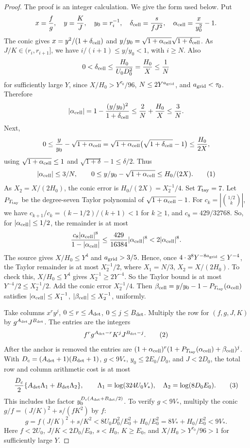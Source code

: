 \begin{proof}
The proof is an integer calculation. We give the form used below. Put
\[
 x={f\over g},\quad y={K\over J},\quad y_0=r_i^{-1},\quad
 \delta_{\rm cell}={s\over fJ^2},\quad
 \alpha_{\rm cell}={x\over y_0^2}-1.
\]
The conic gives \(x=y^2/(1+\delta_{\rm cell})\) and
\(y/y_0=\sqrt{1+\alpha_{\rm cell}}\sqrt{1+\delta_{\rm cell}}\).
As \(J/K\in(r_i,r_{i+1}]\), we have
\(i/(i+1)\le y/y_0<1\), with \(i\ge N\). Also
\[
0<\delta_{\rm cell}\le \frac{H_0}{U_0D_0^2}
=\frac{H_0}{X}\le\frac1N
\]
for sufficiently large \(Y\), since \(X/H_0>Y^{\tau_0}/96\),
\(N\le2Y^{a_{\rm grid}}\), and \(a_{\rm grid}<\tau_0\). Therefore
\[
|\alpha_{\rm cell}|
=1-\frac{(y/y_0)^2}{1+\delta_{\rm cell}}
\le \frac2N+\frac{H_0}{X}
\le\frac3N.
\]
Next,
\[
0\le\frac{y}{y_0}-\sqrt{1+\alpha_{\rm cell}}
=\sqrt{1+\alpha_{\rm cell}}\bigl(\sqrt{1+\delta_{\rm cell}}-1\bigr)
\le\frac{H_0}{2X},
\]
using \(\sqrt{1+\alpha_{\rm cell}}\le1\) and
\(\sqrt{1+\delta}-1\le\delta/2\). Thus
\[
 |\alpha_{\rm cell}|\le3/N,\qquad
 0\le y/y_0-\sqrt{1+\alpha_{\rm cell}}\le H_0/(2X).
 \AutoTag{eq:old:7_10a}
\]
As \(X_2=X/(2H_0)\), the conic error is
\(H_0/(2X)=X_2^{-1}/4\).
Set \(T_{\rm tay}=7\). Let \(P_{T_{\rm tay}}\) be the degree-seven
Taylor polynomial of \(\sqrt{1+\alpha_{\rm cell}}-1\). For
\(c_k=|\binom{1/2}{k}|\), we have
\(c_{k+1}/c_k=(k-1/2)/(k+1)<1\) for \(k\ge1\), and
\(c_8=429/32768\). So, for
\(|\alpha_{\rm cell}|\le1/2\), the remainder is at most
\[
 \frac{c_8|\alpha_{\rm cell}|^8}{1-|\alpha_{\rm cell}|}
 \le\frac{429}{16384}|\alpha_{\rm cell}|^8
 <2|\alpha_{\rm cell}|^8.
\]
The source gives
\(X/H_0\le Y^4\) and \(a_{\rm grid}>3/5\). Hence, once
\(4\cdot3^8Y^{-8a_{\rm grid}}\le Y^{-4}\), the Taylor remainder is at
most \(X_2^{-1}/2\), where \(X_1=N/3\), \(X_2=X/(2H_0)\). To check this,
\(X/H_0\le Y^4\) gives \(X_2^{-1}\ge2Y^{-4}\). So the
Taylor bound is at most \(Y^{-4}/2\le X_2^{-1}/2\). Add the
conic error \(X_2^{-1}/4\). Then
\(\beta_{\rm cell}=y/y_0-1-P_{T_{\rm tay}}(\alpha_{\rm cell})\) satisfies
\(|\alpha_{\rm cell}|\le X_1^{-1}\),
\(|\beta_{\rm cell}|\le X_2^{-1}\), uniformly.

Take columns \(x^r y^j\), \(0\le r\le A_{\rm det}\),
\(0\le j\le B_{\rm det}\). Multiply the row for \((f,g,J,K)\) by
\(g^{A_{\rm det}}J^{B_{\rm det}}\). The entries are the integers
\[
 f^r g^{A_{\rm det}-r}K^jJ^{B_{\rm det}-j}.             \AutoTag{eq:old:7_10b}
\]
After the anchor is removed the entries are
\((1+\alpha_{\rm cell})^r
(1+P_{T_{\rm tay}}(\alpha_{\rm cell})+\beta_{\rm cell})^j\). With
\(D_c=(A_{\rm det}+1)(B_{\rm det}+1)\), \(g<9V_*\),
\(y_0\le2E_0/D_0\), and \(J<2D_0\),
the total row and column arithmetic cost is at most
\[
 {D_c\over2}\{A_{\rm det}\Lambda_1+B_{\rm det}\Lambda_2\},\qquad
 \Lambda_1=\log(324U_0V_*),\quad
 \Lambda_2=\log(8D_0E_0).                                \AutoTag{eq:old:7_10c}
\]
This includes the factor
\(y_0^{D_c(A_{\rm det}+B_{\rm det}/2)}\).
To verify \(g<9V_*\), multiply the conic
\(g/f=(J/K)^2+s/(fK^2)\) by \(f\):
\[
g=f(J/K)^2+s/K^2
 <8U_0D_0^2/E_0^2+H_0/E_0^2
 =8V_*+H_0/E_0^2<9V_*.
\]
Here \(f<2U_0\), \(J/K<2D_0/E_0\), \(s<H_0\), \(K\ge E_0\),
and \(X/H_0>Y^{\tau_0}/96>1\) for sufficiently large \(Y\).


\end{proof}
